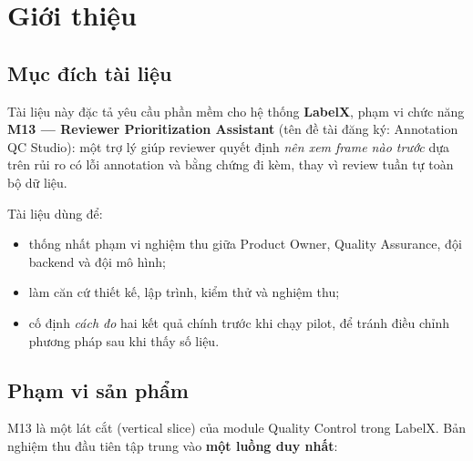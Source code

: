 \chapter{Giới thiệu}
\label{ch:intro}

\section{Mục đích tài liệu}
Tài liệu này đặc tả yêu cầu phần mềm cho hệ thống \textbf{LabelX}, phạm vi
chức năng \textbf{M13 — Reviewer Prioritization Assistant} (tên đề tài đăng ký:
Annotation QC Studio): một trợ lý giúp reviewer quyết định
\emph{nên xem frame nào trước} dựa trên rủi ro có lỗi annotation và bằng chứng
đi kèm, thay vì review tuần tự toàn bộ dữ liệu.

Tài liệu dùng để:
\begin{itemize}
  \item thống nhất phạm vi nghiệm thu giữa Product Owner, Quality Assurance,
        đội backend và đội mô hình;
  \item làm căn cứ thiết kế, lập trình, kiểm thử và nghiệm thu;
  \item cố định \emph{cách đo} hai kết quả chính trước khi chạy pilot, để
        tránh điều chỉnh phương pháp sau khi thấy số liệu.
\end{itemize}

\section{Phạm vi sản phẩm}
\label{sec:scope}
M13 là một lát cắt (vertical slice) của module Quality Control trong LabelX.
Bản nghiệm thu đầu tiên tập trung vào \textbf{một luồng duy nhất}:

\begin{center}
\end{center}

